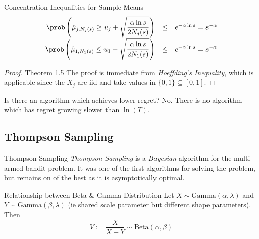 \documentclass[11pt,a4paper]{article}
\begin{document}
  \begin{theorem}{Concentration Inequalities for Sample Means}
    \[\begin{array}{rcl}
    \displaystyle\prob\left(\hat\mu_{j,N_j(s)}\geq u_j+\sqrt\frac{\alpha\ln s}{2N_j(s)}\right)&\leq&e^{-\alpha\ln s}=s^{-\alpha}\\
    \displaystyle\prob\left(\hat\mu_{1,N_1(s)}\leq u_1-\sqrt\frac{\alpha\ln s}{2N_1(s)}\right)&\leq&e^{-\alpha\ln s}=s^{-\alpha}
    \end{array}\]
  \end{theorem}

  \begin{proof}{Theorem 1.5}
    The proof is immediate from \textit{Hoeffding's Inequality}, which is applicable since the $X_j$ are iid and take values in $\{0,1\}\subseteq[0,1]$.
  \end{proof}

  \begin{remark}{Is there an algorithm which achieves lower regret?}
    No. There is no algorithm which has regret growing slower than $\ln(T)$.
  \end{remark}

\subsection{Thompson Sampling}

  \begin{remark}{Thompson Sampling}
    \textit{Thompson Sampling} is a \textit{Bayesian} algorithm for the multi-armed bandit problem. It was one of the first algorithms for solving the problem, but remains on of the best as it is asymptotically optimal.
  \end{remark}

  \begin{theorem}{Relationship between Beta \& Gamma Distribution}
    Let $X\sim\text{Gamma}(\alpha,\lambda)$ and $Y\sim\text{Gamma}(\beta,\lambda)$ (ie shared scale parameter but different shape parameters). Then
    \[ V:=\frac{X}{X+Y}\sim\text{Beta}(\alpha,\beta) \]
  \end{theorem}
\end{document}

